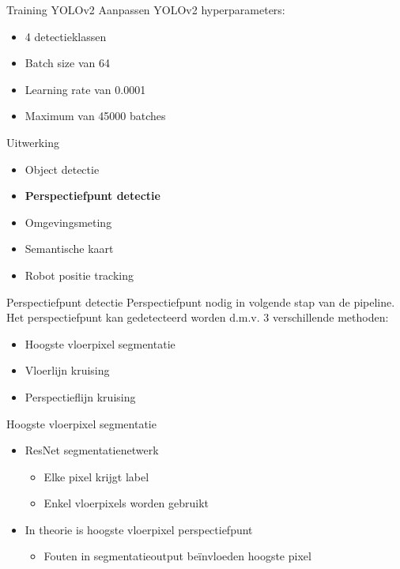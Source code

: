 \documentclass[11pt,t]{beamer}
\begin{document}
\begin{frame}[fragile]{Training YOLOv2}
	Aanpassen YOLOv2 hyperparameters:
	\begin{itemize}
		\item 4 detectieklassen
		\item Batch size van 64
		\item Learning rate van 0.0001
		\item Maximum van 45000 batches
	\end{itemize}
\end{frame}

%
%
\begin{frame}[fragile]{Uitwerking}
	\begin{itemize}
		\item Object detectie
		\item \textbf{Perspectiefpunt detectie}
		\item Omgevingsmeting
		\item Semantische kaart
		\item Robot positie tracking
	\end{itemize}
\end{frame}

\begin{frame}[fragile]{Perspectiefpunt detectie}
	Perspectiefpunt nodig in volgende stap van de pipeline. Het perspectiefpunt kan gedetecteerd worden d.m.v. 3 verschillende methoden:
	\begin{itemize}
		\item Hoogste vloerpixel segmentatie
		\item Vloerlijn kruising
		\item Perspectieflijn kruising
	\end{itemize}
\end{frame}

\begin{frame}[fragile]{Hoogste vloerpixel segmentatie}
	\begin{itemize}
		\item ResNet segmentatienetwerk
		\begin{itemize}
			\item Elke pixel krijgt label
			\item Enkel vloerpixels worden gebruikt
		\end{itemize}
		
		\item In theorie is hoogste vloerpixel perspectiefpunt
		\begin{itemize}
			\item Fouten in segmentatieoutput be\"{i}nvloeden hoogste pixel
		\end{itemize}
	\end{itemize}
\end{frame}
\end{document}
